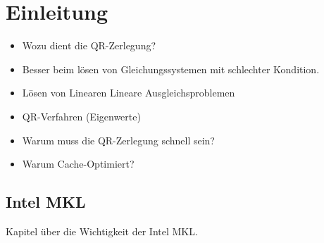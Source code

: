 \chapter{Einleitung}

\begin{itemize}
	\item Wozu dient die QR-Zerlegung?
	
	\item Besser beim lösen von Gleichungssystemen mit schlechter Kondition.
	
	\item Lösen von Linearen Lineare Ausgleichsproblemen
	
	\item QR-Verfahren (Eigenwerte)
	
	\item Warum muss die QR-Zerlegung schnell sein?
	
	\item Warum Cache-Optimiert?
\end{itemize}


\section{Intel MKL}

Kapitel über die Wichtigkeit der Intel MKL.

